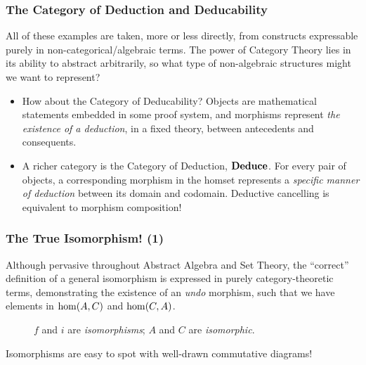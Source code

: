 \documentclass{beamer}
\numberwithin{figure}{section}
\begin{document}
\begin{frame}
        \frametitle{The Category of Deduction and Deducability}
        All of these examples are taken, more or less directly, from constructs
        expressable purely in non-categorical/algebraic terms. The power of
        Category Theory lies in its ability to abstract arbitrarily, so what
        type of non-algebraic structures might we want to represent?
        \pause
        \begin{itemize}
                \item How about the Category of Deducability? Objects are
                        mathematical statements embedded in some proof system,
                        and morphisms represent \emph{the existence of a
                        deduction}, in a fixed theory, between antecedents and
                        consequents.
                \item A richer category is the Category of Deduction,
                        $\operatorname{\text{\textbf{Deduce}}}$. For every pair of objects, a corresponding
                        morphism in the homset represents a \emph{specific
                        manner of deduction} between its domain and codomain.
                        Deductive cancelling is equivalent to morphism
                        composition!
        \end{itemize}
\end{frame}

\begin{frame}
        \frametitle{The True Isomorphism! (1)}
        Although pervasive throughout Abstract Algebra and Set Theory, the
        ``correct'' definition of a general isomorphism is expressed in purely
        category-theoretic terms, demonstrating the existence of an \emph{undo}
        morphism, such that we have elements in $\operatorname{hom}(A,C)$ and
        $\operatorname{hom}(C,A)$.
        \pause
        \begin{figure}
                \caption{$f$ and $i$ are \emph{isomorphisms}; $A$ and $C$ are
                        \emph{isomorphic}.}
        \end{figure}
        \pause
        Isomorphisms are easy to spot with well-drawn commutative diagrams!
\end{frame}
\end{document}
